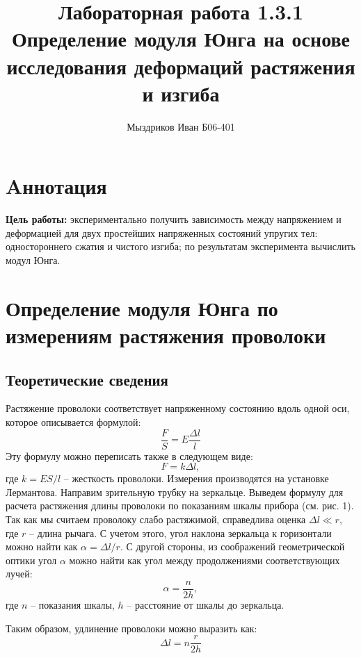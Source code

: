 \documentclass[12pt]{article}
\title{Лабораторная работа 1.3.1 \\
       Определение модуля Юнга на основе исследования деформаций растяжения и изгиба}
\author{Мыздриков Иван Б06-401}
\begin{document}
    \maketitle

    \section{Aннотация}
    \par \textbf{Цель работы:} экспериментально получить зависимость между напряжением и деформацией
    для двух простейших напряженных состояний упругих тел: одностороннего сжатия и чистого изгиба;
    по результатам эксперимента вычислить модул Юнга.\\
\newpage

    \section{Определение модуля Юнга по измерениям растяжения проволоки}
    \subsection{Теоретические сведения}
    Растяжение проволоки соответствует напряженному состоянию вдоль одной оси, которое описывается формулой:
\begin{equation}
    \frac{F}{S} = E \frac{\Delta l}{l}
    \label{lermantov}
\end{equation}
    Эту формулу можно переписать также в следующем виде:
    \begin{equation}
        F = k\Delta l,
    \end{equation}
    где $k = ES / l$ -- жесткость проволоки.
    Измерения производятся на установке Лермантова.
    Направим зрительную трубку на зеркальце.
    Выведем формулу для расчета растяжения длины проволоки по показаниям шкалы
    прибора (см. рис. 1).
    Так как мы считаем проволоку слабо растяжимой, справедлива оценка $\Delta l \ll r$, где
    $r$ -- длина рычага. С учетом этого, угол наклона зеркальца к горизонтали можно
    найти как $\alpha = \Delta l/r$. С другой стороны, из соображений геометрической оптики
    угол $\alpha$ можно найти как угол между продолжениями соответствующих лучей:
    \begin{equation}
        \alpha = \frac{n}{2h},
    \end{equation}
    где $n$ -- показания шкалы, $h$ -- расстояние от шкалы до
    зеркальца.
    \par Таким образом, удлинение проволоки можно выразить как:
    \begin{equation}
        \Delta l = n\frac{r}{2h}
        \label{dlina}
    \end{equation}
\end{document}
